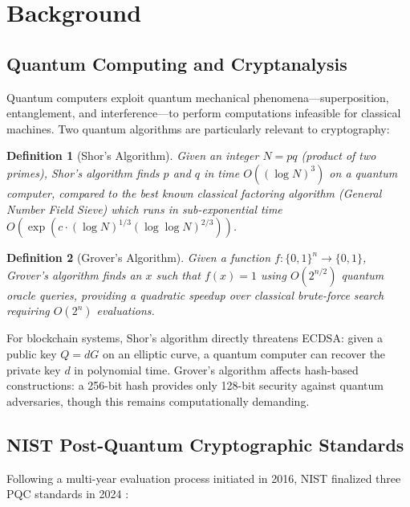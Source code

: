 \documentclass[12pt, a4paper, twocolumn]{article}
\newtheorem{definition}{Definition}
\begin{document}
\section{Background}
\label{sec:background}

\subsection{Quantum Computing and Cryptanalysis}

Quantum computers exploit quantum mechanical phenomena---superposition, entanglement, and interference---to perform computations infeasible for classical machines. Two quantum algorithms are particularly relevant to cryptography:

\begin{definition}[Shor's Algorithm]
Given an integer $N = pq$ (product of two primes), Shor's algorithm finds $p$ and $q$ in time $O((\log N)^3)$ on a quantum computer, compared to the best known classical factoring algorithm (General Number Field Sieve) which runs in sub-exponential time $O\!\left(\exp\!\left(c \cdot (\log N)^{1/3} (\log\log N)^{2/3}\right)\right)$.
\end{definition}

\begin{definition}[Grover's Algorithm]
Given a function $f:\{0,1\}^n \to \{0,1\}$, Grover's algorithm finds an $x$ such that $f(x) = 1$ using $O(2^{n/2})$ quantum oracle queries, providing a quadratic speedup over classical brute-force search requiring $O(2^n)$ evaluations.
\end{definition}

For blockchain systems, Shor's algorithm directly threatens ECDSA: given a public key $Q = dG$ on an elliptic curve, a quantum computer can recover the private key $d$ in polynomial time. Grover's algorithm affects hash-based constructions: a 256-bit hash provides only 128-bit security against quantum adversaries, though this remains computationally demanding.

\subsection{NIST Post-Quantum Cryptographic Standards}

Following a multi-year evaluation process initiated in 2016, NIST finalized three PQC standards in 2024 \cite{nist2024pqc}:
\end{document}
